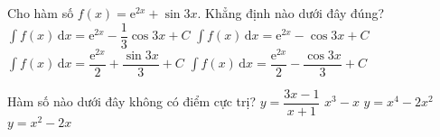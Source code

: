 \begin{ex}%
	Cho hàm số $f(x)=\mathrm{e}^{2x}+\sin3x$. Khẳng định nào dưới đây đúng?
	\choice
	{$\displaystyle\int f(x)\mathrm{\,d}x=\mathrm{e}^{2x}-\dfrac{1}{3}\cos3x+C$}
	{$\displaystyle\int f(x)\mathrm{\,d}x=\mathrm{e}^{2x}-\cos3x+C$}
	{ $\displaystyle\int f(x)\mathrm{\,d}x=\dfrac{\mathrm{e}^{2x}}{2}+\dfrac{\sin3x}{3}+C$}
	{\True$\displaystyle\int f(x)\mathrm{\,d}x=\dfrac{\mathrm{e}^{2x}}{2}-\dfrac{\cos3x}{3}+C$}
\end{ex}

\begin{ex}%
	Hàm số nào dưới đây không có điểm cực trị?
	\choice
	{\True$y=\dfrac{3x-1}{x+1}$}
	{$x^3-x$}
	{$y=x^4-2x^2$}
	{$y=x^2-2x$}
\end{ex}

